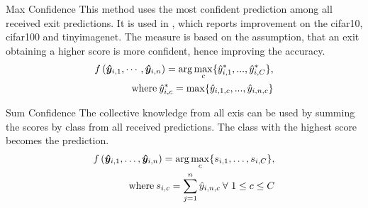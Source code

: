 \begin{enumdescript}
\begin{enumdescript}
			\item[Max Confidence] This method uses the most confident prediction among all received exit predictions. It is used in \cite{kaya_shallow-deep_nodate}, which reports improvement on the \gls{cifar10}, \gls{cifar100} and \gls{tinyimagenet}. The measure is based on the assumption, that an exit obtaining a higher score is more confident, hence improving the accuracy.
			\begin{align}
			\begin{split}
			f\left(\bm{\hat{y}}_{i,1}, \cdots, \bm{\hat{y}}_{i,n} \right) =  \arg \underset{c}{\max} \{\hat{y}^*_{i,1}, ..., \hat{y}^*_{i,C} \},
			\\ \text{where\:} \hat{y}^*_{i,c} = \max \{\hat{y}_{i,1,c}, ..., \hat{y}_{i,n,c}\}
			\end{split}	
			\end{align}
			\item[Sum Confidence] The collective knowledge from all exis can be used by summing the scores by class from all received predictions. The class with the highest score becomes the prediction.
			\begin{align}
			\begin{split}
			f\left(\bm{\hat{y}}_{i,1}, \dots, \bm{\hat{y}}_{i,n} \right) = \arg \underset{c}{\max} \{s_{i,1}, \dots, s_{i,C}\}, \\ \text{where\:} s_{i,c} = \sum_{j=1}^{n}\hat{y}_{i,n,c}\: \forall \ 1\le c \le C
			\end{split}
			\end{align}
			
			

\end{enumdescript}
\end{enumdescript}
